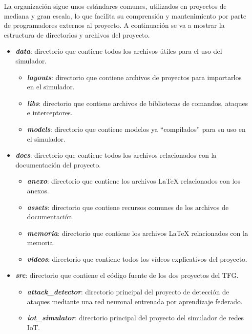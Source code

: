 La organización sigue unos estándares comunes, utilizados en proyectos de mediana y gran escala, lo que facilita su comprensión y mantenimiento por parte de programadores externos al proyecto. A continuación se va a mostrar la estructura de directorios y archivos del proyecto.
\begin{itemize}
    \item \textit{\textbf{data}}: directorio que contiene todos los archivos útiles para el uso del simulador.
    \begin{itemize}
        \item \textit{\textbf{layouts}}: directorio que contiene archivos de proyectos para importarlos en el simulador. 
        \item \textit{\textbf{libs}}: directorio que contiene archivos de bibliotecas de comandos, ataques e interceptores.
        \item \textit{\textbf{models}}: directorio que contiene modelos ya ``compilados'' para su uso en el simulador.
    \end{itemize} 
    \item \textit{\textbf{docs}}: directorio que contiene todos los archivos relacionados con la documentación del proyecto.
    \begin{itemize}
        \item \textit{\textbf{anexo}}: directorio que contiene los archivos LaTeX relacionados con los anexos.
        \item \textit{\textbf{assets}}: directorio que contiene recursos comunes de los archivos de documentación.
        \item \textit{\textbf{memoria}}: directorio que contiene los archivos LaTeX relacionados con la memoria.
        \item \textit{\textbf{videos}}: directorio que contiene todos los vídeos explicativos del proyecto.
    \end{itemize}
    \item \textit{\textbf{src}}: directorio que contiene el código fuente de los dos proyectos del TFG.
    \begin{itemize}
        \item \textit{\textbf{attack\_detector}}: directorio principal del proyecto de detección de ataques mediante una red neuronal entrenada por aprendizaje federado.
        \item \textit{\textbf{iot\_simulator}}: directorio principal del proyecto del simulador de redes IoT.
    \end{itemize}

\end{itemize}
